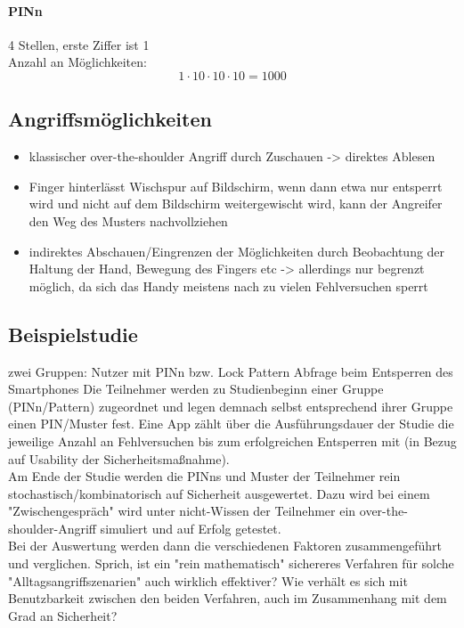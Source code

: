 \paragraph{PINn}
4 Stellen, erste Ziffer ist 1 \\
Anzahl an Möglichkeiten:
\begin{equation}
1 \cdot 10 \cdot 10 \cdot 10 = 1000
\end{equation}

\subsection{Angriffsmöglichkeiten}

\begin{itemize}
\item klassischer over-the-shoulder Angriff durch Zuschauen -> direktes Ablesen
\item Finger hinterlässt Wischspur auf Bildschirm, wenn dann etwa nur entsperrt wird und nicht auf dem Bildschirm weitergewischt wird, kann der Angreifer den Weg des Musters nachvollziehen
\item indirektes Abschauen/Eingrenzen der Möglichkeiten durch Beobachtung der Haltung der Hand, Bewegung des Fingers etc -> allerdings nur begrenzt möglich, da sich das Handy meistens nach zu vielen Fehlversuchen sperrt
\end{itemize}

\subsection{Beispielstudie}
zwei Gruppen: Nutzer mit PINn bzw. Lock Pattern Abfrage beim Entsperren des Smartphones
Die Teilnehmer werden zu Studienbeginn einer Gruppe (PINn/Pattern) zugeordnet und legen demnach selbst entsprechend ihrer Gruppe einen PIN/Muster fest. Eine App zählt über die Ausführungsdauer der Studie die jeweilige Anzahl an Fehlversuchen bis zum erfolgreichen Entsperren mit (in Bezug auf Usability der Sicherheitsmaßnahme). \\
Am Ende der Studie werden die PINns und Muster der Teilnehmer rein stochastisch/kombinatorisch auf Sicherheit ausgewertet. Dazu wird bei einem "Zwischengespräch" wird unter nicht-Wissen der Teilnehmer ein over-the-shoulder-Angriff simuliert und auf Erfolg getestet. \\
Bei der Auswertung werden dann die verschiedenen Faktoren zusammengeführt und verglichen. Sprich, ist ein "rein mathematisch" sichereres Verfahren für solche "Alltagsangriffszenarien" auch wirklich effektiver? Wie verhält es sich mit Benutzbarkeit zwischen den beiden Verfahren, auch im Zusammenhang mit dem Grad an Sicherheit?

